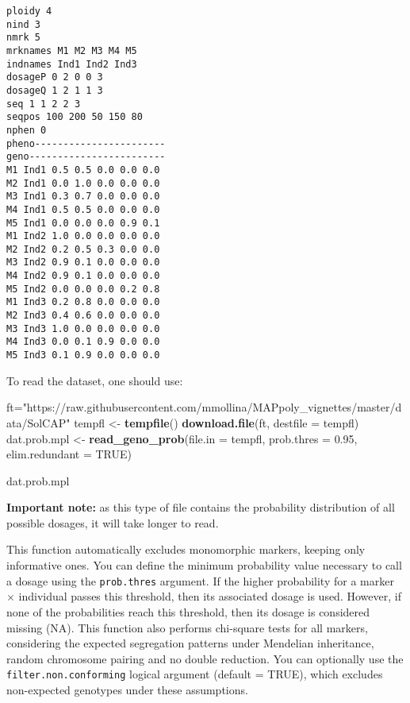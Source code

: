 \documentclass[
]{article}
\newenvironment{Shaded}{}{}
\newcommand{\DataTypeTok}[1]{\textcolor[rgb]{0.56,0.13,0.00}{#1}}
\newcommand{\FloatTok}[1]{\textcolor[rgb]{0.25,0.63,0.44}{#1}}
\newcommand{\KeywordTok}[1]{\textcolor[rgb]{0.00,0.44,0.13}{\textbf{#1}}}
\newcommand{\NormalTok}[1]{#1}
\newcommand{\OtherTok}[1]{\textcolor[rgb]{0.00,0.44,0.13}{#1}}
\newcommand{\StringTok}[1]{\textcolor[rgb]{0.25,0.44,0.63}{#1}}
\begin{document}
\begin{verbatim}
ploidy 4
nind 3
nmrk 5
mrknames M1 M2 M3 M4 M5
indnames Ind1 Ind2 Ind3
dosageP 0 2 0 0 3
dosageQ 1 2 1 1 3
seq 1 1 2 2 3
seqpos 100 200 50 150 80
nphen 0
pheno-----------------------
geno------------------------
M1 Ind1 0.5 0.5 0.0 0.0 0.0
M2 Ind1 0.0 1.0 0.0 0.0 0.0
M3 Ind1 0.3 0.7 0.0 0.0 0.0
M4 Ind1 0.5 0.5 0.0 0.0 0.0
M5 Ind1 0.0 0.0 0.0 0.9 0.1
M1 Ind2 1.0 0.0 0.0 0.0 0.0
M2 Ind2 0.2 0.5 0.3 0.0 0.0
M3 Ind2 0.9 0.1 0.0 0.0 0.0
M4 Ind2 0.9 0.1 0.0 0.0 0.0
M5 Ind2 0.0 0.0 0.0 0.2 0.8
M1 Ind3 0.2 0.8 0.0 0.0 0.0
M2 Ind3 0.4 0.6 0.0 0.0 0.0
M3 Ind3 1.0 0.0 0.0 0.0 0.0
M4 Ind3 0.0 0.1 0.9 0.0 0.0
M5 Ind3 0.1 0.9 0.0 0.0 0.0
\end{verbatim}

To read the dataset, one should use:

\begin{Shaded}
\begin{Highlighting}[]
\NormalTok{ft=}\StringTok{"https://raw.githubusercontent.com/mmollina/MAPpoly_vignettes/master/data/SolCAP"}
\NormalTok{tempfl <-}\StringTok{ }\KeywordTok{tempfile}\NormalTok{()}
\KeywordTok{download.file}\NormalTok{(ft, }\DataTypeTok{destfile =}\NormalTok{ tempfl)}
\NormalTok{dat.prob.mpl <-}\StringTok{ }\KeywordTok{read_geno_prob}\NormalTok{(}\DataTypeTok{file.in  =}\NormalTok{ tempfl, }\DataTypeTok{prob.thres =} \FloatTok{0.95}\NormalTok{, }\DataTypeTok{elim.redundant =} \OtherTok{TRUE}\NormalTok{)}
\end{Highlighting}
\end{Shaded}

\begin{Shaded}
\begin{Highlighting}[]
\NormalTok{dat.prob.mpl}
\end{Highlighting}
\end{Shaded}

\textbf{Important note:} as this type of file contains the probability
distribution of all possible dosages, it will take longer to read.

This function automatically excludes monomorphic markers, keeping only
informative ones. You can define the minimum probability value necessary
to call a dosage using the \texttt{prob.thres} argument. If the higher
probability for a marker \(\times\) individual passes this threshold,
then its associated dosage is used. However, if none of the
probabilities reach this threshold, then its dosage is considered
missing (NA). This function also performs chi-square tests for all
markers, considering the expected segregation patterns under Mendelian
inheritance, random chromosome pairing and no double reduction. You can
optionally use the \texttt{filter.non.conforming} logical argument
(default = TRUE), which excludes non-expected genotypes under these
assumptions.
\end{document}
